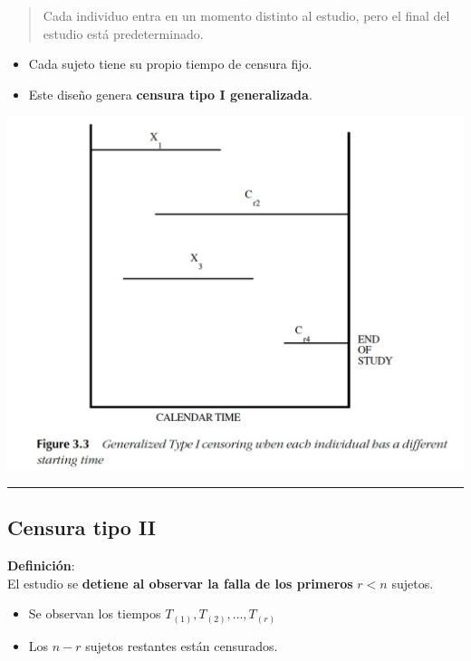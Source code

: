 \documentclass[
  letterpaper,
  DIV=11,
  numbers=noendperiod]{scrartcl}
\providecommand{\tightlist}{%
  \setlength{\itemsep}{0pt}\setlength{\parskip}{0pt}}
\begin{document}
\begin{quote}
Cada individuo entra en un momento distinto al estudio, pero el final
del estudio está predeterminado.
\end{quote}

\begin{itemize}
\tightlist
\item
  Cada sujeto tiene su propio tiempo de censura fijo.
\item
  Este diseño genera \textbf{censura tipo I generalizada}.
\end{itemize}

\begin{center}
\includegraphics[width=1\linewidth,height=\textheight,keepaspectratio]{figura/CensuraI-2.jpg}
\end{center}

\begin{center}\rule{0.5\linewidth}{0.5pt}\end{center}

\subsection{Censura tipo II}\label{censura-tipo-ii}

\textbf{Definición}:\\
El estudio se \textbf{detiene al observar la falla de los primeros}
\(r < n\) sujetos.

\begin{itemize}
\tightlist
\item
  Se observan los tiempos \(T_{(1)}, T_{(2)}, \dots, T_{(r)}\)
\item
  Los \(n - r\) sujetos restantes están censurados.
\end{itemize}
\end{document}
